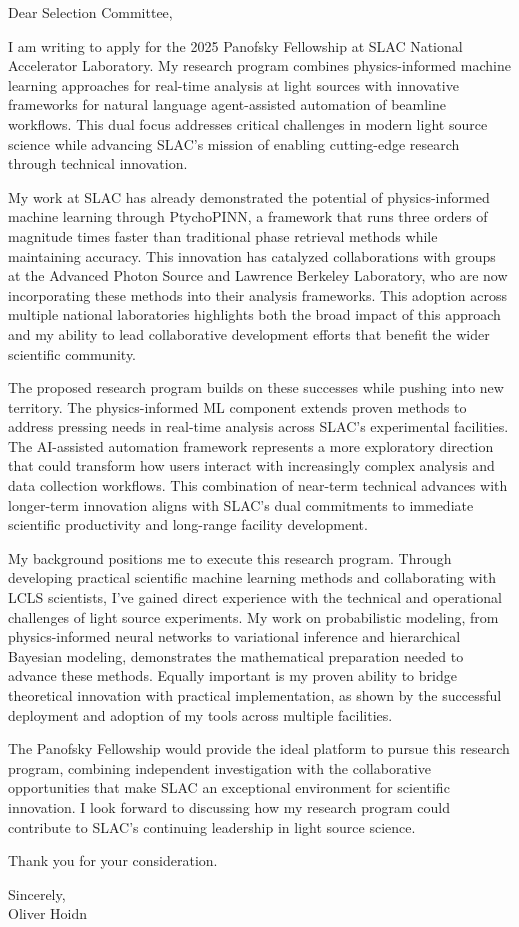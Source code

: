 \documentclass[letterpaper,11pt]{article}
\begin{document}
\vspace*{2\baselineskip}

Dear Selection Committee,

I am writing to apply for the 2025 Panofsky Fellowship at SLAC National Accelerator Laboratory. My research program combines physics-informed machine learning approaches for real-time analysis at light sources with innovative frameworks for natural language agent-assisted automation of beamline workflows. This dual focus addresses critical challenges in modern light source science while advancing SLAC's mission of enabling cutting-edge research through technical innovation.

My work at SLAC has already demonstrated the potential of physics-informed machine learning through PtychoPINN, a framework that runs three orders of magnitude times faster than traditional phase retrieval methods while maintaining accuracy. This innovation has catalyzed collaborations with groups at the Advanced Photon Source and Lawrence Berkeley Laboratory, who are now incorporating these methods into their analysis frameworks. This adoption across multiple national laboratories highlights both the broad impact of this approach and my ability to lead collaborative development efforts that benefit the wider scientific community.

The proposed research program builds on these successes while pushing into new territory. The physics-informed ML component extends proven methods to address pressing needs in real-time analysis across SLAC's experimental facilities. The AI-assisted automation framework represents a more exploratory direction that could transform how users interact with increasingly complex analysis and data collection workflows. This combination of near-term technical advances with longer-term innovation aligns with SLAC's dual commitments to immediate scientific productivity and long-range facility development.

My background positions me to execute this research program. Through developing practical scientific machine learning methods and collaborating with LCLS scientists, I've gained direct experience with the technical and operational challenges of light source experiments. My work on probabilistic modeling, from physics-informed neural networks to variational inference and hierarchical Bayesian modeling, demonstrates the mathematical preparation needed to advance these methods. Equally important is my proven ability to bridge theoretical innovation with practical implementation, as shown by the successful deployment and adoption of my tools across multiple facilities.

The Panofsky Fellowship would provide the ideal platform to pursue this research program, combining independent investigation with the collaborative opportunities that make SLAC an exceptional environment for scientific innovation. I look forward to discussing how my research program could contribute to SLAC's continuing leadership in light source science.

Thank you for your consideration.

\vspace{\baselineskip}

Sincerely,\\
Oliver Hoidn
\end{document}
